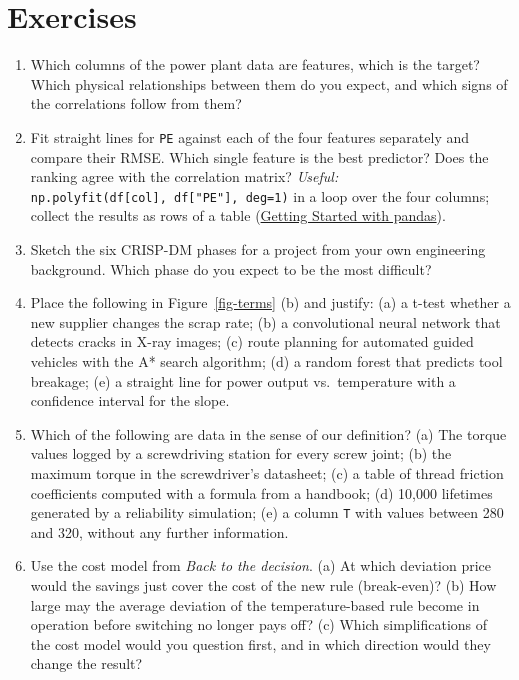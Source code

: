 \documentclass[
  letterpaper,
  DIV=11,
  numbers=noendperiod]{scrreprt}
\providecommand{\tightlist}{%
  \setlength{\itemsep}{0pt}\setlength{\parskip}{0pt}}\usepackage{longtable,booktabs,array}
\begin{document}
\section{Exercises}\label{exercises-1}

\begin{enumerate}
\def\labelenumi{\arabic{enumi}.}
\tightlist
\item
  Which columns of the power plant data are features, which is the
  target? Which physical relationships between them do you expect, and
  which signs of the correlations follow from them?
\item
  Fit straight lines for \texttt{PE} against each of the four features
  separately and compare their RMSE. Which single feature is the best
  predictor? Does the ranking agree with the correlation matrix?
  \emph{Useful:} \texttt{np.polyfit(df{[}col{]},\ df{[}"PE"{]},\ deg=1)}
  in a loop over the four columns; collect the results as rows of a
  table (\href{00-pandas.ipynb}{Getting Started with pandas}).
\item
  Sketch the six CRISP-DM phases for a project from your own engineering
  background. Which phase do you expect to be the most difficult?
\item
  Place the following in Figure~\ref{fig-terms} (b) and justify: (a) a
  t-test whether a new supplier changes the scrap rate; (b) a
  convolutional neural network that detects cracks in X-ray images; (c)
  route planning for automated guided vehicles with the A* search
  algorithm; (d) a random forest that predicts tool breakage; (e) a
  straight line for power output vs.~temperature with a confidence
  interval for the slope.
\item
  Which of the following are data in the sense of our definition? (a)
  The torque values logged by a screwdriving station for every screw
  joint; (b) the maximum torque in the screwdriver's datasheet; (c) a
  table of thread friction coefficients computed with a formula from a
  handbook; (d) 10,000 lifetimes generated by a reliability simulation;
  (e) a column \texttt{T} with values between 280 and 320, without any
  further information.
\item
  Use the cost model from \emph{Back to the decision}. (a) At which
  deviation price would the savings just cover the cost of the new rule
  (break-even)? (b) How large may the average deviation of the
  temperature-based rule become in operation before switching no longer
  pays off? (c) Which simplifications of the cost model would you
  question first, and in which direction would they change the result?
\end{enumerate}
\end{document}
